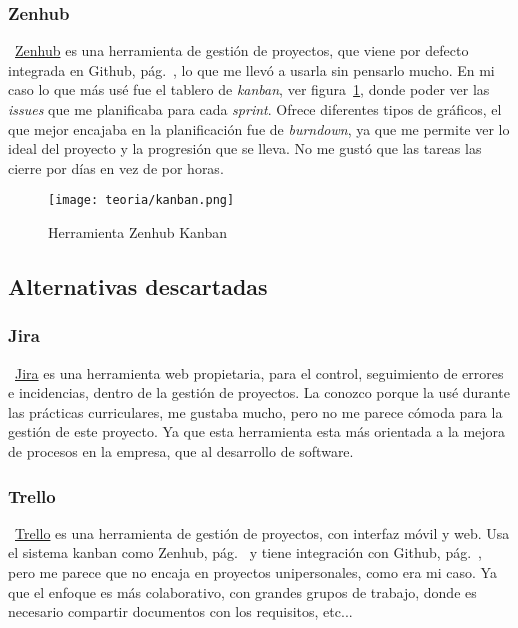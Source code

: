 \subsubsection{Zenhub}\label{zenhub}
~\href{https://bitbucket.org/product//}{Zenhub} es una herramienta de gestión de proyectos, que viene por defecto integrada en Github, pág.~\pageref{github}, lo que me llevó a usarla sin pensarlo mucho. En mi caso lo que más usé fue el tablero de \emph{kanban}, ver figura~\ref{fig:zenhub}, donde poder ver las \emph{issues} que me planificaba para cada \emph{sprint}. Ofrece diferentes tipos de gráficos, el que mejor encajaba en la planificación fue de \emph{burndown}, ya que me permite ver lo ideal del proyecto y la progresión que se lleva. No me gustó que las tareas las cierre por días en vez de por horas.

\begin{figure}%
	\centering
	\texttt{[image: teoria/kanban.png]}
	\caption{Herramienta Zenhub Kanban}\label{fig:zenhub}
\end{figure}

\subsection{Alternativas descartadas}

\subsubsection{Jira}
~\href{https://www.atlassian.com/es/software/jira}{Jira} es una herramienta web propietaria, para el control, seguimiento de errores e incidencias, dentro de la gestión de proyectos. La conozco porque la usé durante las prácticas curriculares, me gustaba mucho, pero no me parece cómoda para la gestión de este proyecto. Ya que esta herramienta esta más orientada a la mejora de procesos en la empresa, que al desarrollo de software.

\subsubsection{Trello}
~\href{https://trello.com/es}{Trello} es una herramienta de gestión de proyectos, con interfaz móvil y web. Usa el sistema kanban como Zenhub, pág.~\pageref{zenhub} y tiene integración con Github, pág.~\pageref{github}, pero me parece que no encaja en proyectos unipersonales, como era mi caso. Ya que el enfoque es más colaborativo, con grandes grupos de trabajo, donde es necesario compartir documentos con los requisitos, etc...

